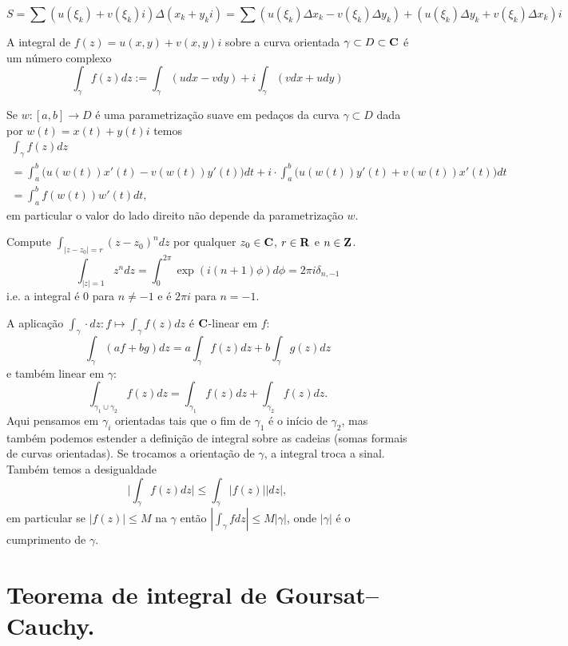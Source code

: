 $$ S = \sum (u(\xi_k)+v(\xi_k)i) \Delta (x_k + y_k i) 
= \sum (u(\xi_k) \Delta x_k - v(\xi_k) \Delta y_k) + (u(\xi_k) \Delta y_k + v(\xi_k) \Delta x_k)i $$

\begin{defin}
A integral de $f(z) = u(x,y) + v(x,y) i$ sobre a curva orientada $\gamma \subset D \subset \mathbf{C}$ é um número complexo
\[ \int_\gamma f(z) dz := \int_\gamma (u dx - v dy) + i \int_\gamma (v dx + u dy) \]
\end{defin}

Se $w: [a,b] \to D$ é uma parametrização suave em pedaços da curva $\gamma \subset D$
dada por $w(t) = x(t) + y(t) i$ temos
\begin{multline}
\int_\gamma f(z) dz \\ 
  =       \int_a^b \big( u(w(t)) x'(t) - v(w(t)) y'(t) \big) dt 
+ i \cdot \int_a^b \big( u(w(t)) y'(t) + v(w(t)) x'(t) \big) dt
\\ = \int_a^b f(w(t)) w'(t) dt,
\end{multline}
em particular o valor do lado direito não depende da parametrização $w$.

\begin{exem}
Compute $\int_{|z-z_0|=r} (z-z_0)^n dz$ por qualquer $z_0\in\mathbf{C}$, $r\in\mathbf{R}$ e $n \in \mathbf{Z}$.
$$ \int_{|z|=1} z^n dz = \int_0^{2\pi} \exp(i(n+1)\phi) d\phi = 2\pi i \delta_{n,-1} $$
i.e. a integral é $0$ para $n\neq -1$ e é $2\pi i$ para $n=-1$.
\end{exem}

\begin{teorema}
A aplicação $\int_\gamma \cdot dz : f \mapsto \int_\gamma f(z) dz$ é $\mathbf{C}$-linear em $f$:
$$ \int_\gamma (a f + b g) dz = a \int_\gamma f(z) dz + b \int_\gamma g(z) dz $$
e também linear em $\gamma$:
$$ \int_{\gamma_1 \cup \gamma_2} f(z) dz = \int_{\gamma_1} f(z) dz + \int_{\gamma_2} f(z) dz.$$
Aqui pensamos em $\gamma_i$ orientadas tais que o fim de $\gamma_1$ é o início de $\gamma_2$,
mas também podemos estender a definição de integral sobre as cadeias (somas formais de curvas orientadas).
Se trocamos a orientação de $\gamma$, a integral troca a sinal.
Também temos a desigualdade
\[ \big|\int_\gamma f(z) dz\big| \leq \int_\gamma |f(z)| |dz|, \]
em particular se $|f(z)|\leq M$ na $\gamma$ então $|\int_\gamma f dz| \leq M |\gamma|$,
onde $|\gamma|$ é o cumprimento de $\gamma$.
\end{teorema}

\section{Teorema de integral de Goursat--Cauchy.}

